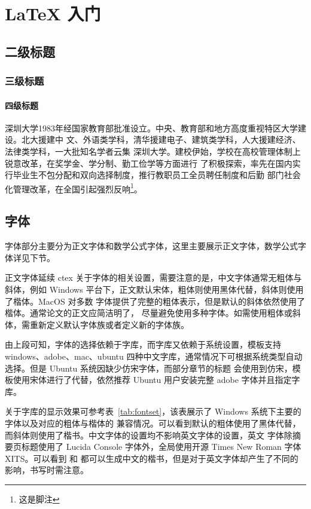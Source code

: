 \chapter{\LaTeX{} 入门}

\section{二级标题}

\subsection{三级标题}

\subsubsection{四级标题}

深圳大学1983年经国家教育部批准设立。中央、教育部和地方高度重视特区大学建设。北大援建中
文、外语类学科，清华援建电子、建筑类学科，人大援建经济、法律类学科，一大批知名学者云集
深圳大学。建校伊始，学校在高校管理体制上锐意改革，在奖学金、学分制、勤工俭学等方面进行
了积极探索，率先在国内实行毕业生不包分配和双向选择制度，推行教职员工全员聘任制度和后勤
部门社会化管理改革，在全国引起强烈反响\footnote{这是脚注}。

\section{字体}

字体部分主要分为正文字体和数学公式字体，这里主要展示正文字体，数学公式字体详见下节。

正文字体延续 ctex 关于字体的相关设置，需要注意的是，中文字体通常无粗体与斜体，例如
Windows 平台下，正文默认宋体，粗体则使用黑体代替，斜体则使用了楷体。MacOS 对多数
字体提供了完整的粗体表示，但是默认的斜体依然使用了楷体。通常论文的正文应简洁明了，
尽量避免使用多种字体。如需使用粗体或斜体，需重新定义默认字体族或者定义新的字体族。

由上段可知，字体的选择依赖于字库，而字库又依赖于系统设置，模板支持windows、adobe、mac、ubuntu
四种中文字库，通常情况下可根据系统类型自动选择。但是 Ubuntu 系统因缺少仿宋字体，而部分章节的标题
会使用到仿宋，模板使用宋体进行了代替，依然推荐 Ubuntu 用户安装完整 adobe 字体并且指定字库。

关于字库的显示效果可参考表~\ref{tab:fontset}，该表展示了 Windows 系统下主要的字体以及对应的粗体与楷体的
兼容情况。可以看到默认的粗体使用了黑体代替，而斜体则使用了楷书。中文字体的设置均不影响英文字体的设置，英文
字体除摘要页标题使用了 Lucida Console 字体外，全局使用开源 Times New Roman 字体 XITS。可以看到 
和  都可以生成中文的楷书，但是对于英文字体却产生了不同的影响，书写时需注意。

